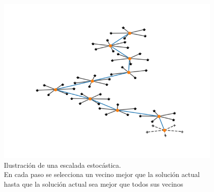 \begin{figure}[H]
\centering
\includegraphics[scale=.5]{Imagenes/mettray.png}
    \caption{Ilustración de una escalada estocástica.\\ En cada paso se selecciona un vecino mejor que la solución actual hasta que la solución actual sea mejor que todos sus vecinos}
\end{figure}

